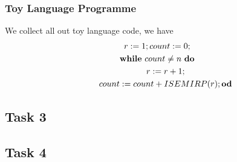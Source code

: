 \documentclass[a4paper,12pt,fleqn]{scrartcl}
\begin{document}
\subsubsection{Toy Language Programme}
We collect all out toy language code, we have 
\begin{gather*}
  r \mathrel{:=} 1; count \mathrel{:=} 0;\\
  \text{\normalfont\bfseries while} ~count \neq n ~ \text{\normalfont\bfseries do} \\
  \qquad r \mathrel{:=} r+1;\\
  \qquad count \mathrel{:=} count + ISEMIRP(r);
  \text{\normalfont\bfseries od} 
\end{gather*}


\subsection{Task 3}
\subsection{Task 4}
\end{document}

